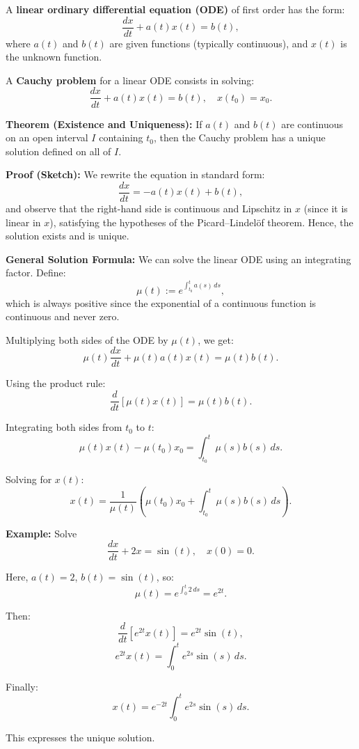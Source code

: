 
A \textbf{linear ordinary differential equation (ODE)} of first order has the form:
\[
\frac{dx}{dt} + a(t)x(t) = b(t),
\]
where \( a(t) \) and \( b(t) \) are given functions (typically continuous), and \( x(t) \) is the unknown function.

A \textbf{Cauchy problem} for a linear ODE consists in solving:
\[
\frac{dx}{dt} + a(t)x(t) = b(t), \quad x(t_0) = x_0.
\]

\textbf{Theorem (Existence and Uniqueness):}  
If \( a(t) \) and \( b(t) \) are continuous on an open interval \( I \) containing \( t_0 \), then the Cauchy problem has a unique solution defined on all of \( I \).

\textbf{Proof (Sketch):}  
We rewrite the equation in standard form:
\[
\frac{dx}{dt} = -a(t)x(t) + b(t),
\]
and observe that the right-hand side is continuous and Lipschitz in \( x \) (since it is linear in \( x \)), satisfying the hypotheses of the Picard–Lindelöf theorem. Hence, the solution exists and is unique.

\textbf{General Solution Formula:}  
We can solve the linear ODE using an integrating factor. Define:
\[
\mu(t) := e^{\int_{t_0}^t a(s)\,ds},
\]
which is always positive since the exponential of a continuous function is continuous and never zero.

Multiplying both sides of the ODE by \( \mu(t) \), we get:
\[
\mu(t) \frac{dx}{dt} + \mu(t)a(t)x(t) = \mu(t)b(t).
\]

Using the product rule:
\[
\frac{d}{dt}[\mu(t)x(t)] = \mu(t)b(t).
\]

Integrating both sides from \( t_0 \) to \( t \):
\[
\mu(t)x(t) - \mu(t_0)x_0 = \int_{t_0}^{t} \mu(s)b(s)\,ds.
\]

Solving for \( x(t) \):
\[
x(t) = \frac{1}{\mu(t)}\left( \mu(t_0)x_0 + \int_{t_0}^{t} \mu(s)b(s)\,ds \right).
\]

\textbf{Example:} Solve
\[
\frac{dx}{dt} + 2x = \sin(t), \quad x(0) = 0.
\]

Here, \( a(t) = 2 \), \( b(t) = \sin(t) \), so:
\[
\mu(t) = e^{\int_0^t 2\,ds} = e^{2t}.
\]

Then:
\[
\frac{d}{dt}[e^{2t}x(t)] = e^{2t}\sin(t),
\]
\[
e^{2t}x(t) = \int_0^t e^{2s}\sin(s)\,ds.
\]

Finally:
\[
x(t) = e^{-2t} \int_0^t e^{2s} \sin(s)\,ds.
\]

This expresses the unique solution.